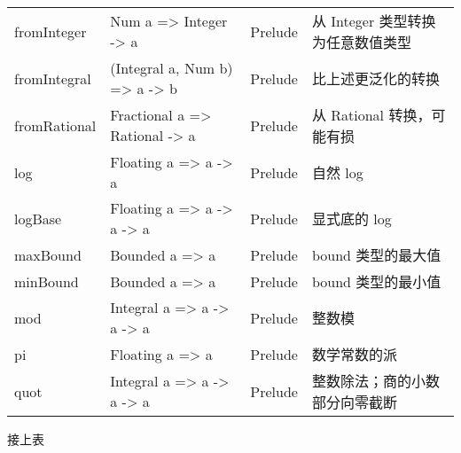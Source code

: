 \documentclass[./main.tex]{subfiles}
\begin{document}
\begin{center}
\begin{tabular}{|l|p{6cm}|l|p{3cm}|}
    fromInteger    & Num a => Integer -> a                     & Prelude    & 从 Integer 类型转换为任意数值类型       \\
    fromIntegral   & (Integral a, Num b) => a -> b             & Prelude    & 比上述更泛化的转换                   \\
    fromRational   & Fractional a => Rational -> a             & Prelude    & 从 Rational 转换，可能有损          \\
    log            & Floating a => a -> a                      & Prelude    & 自然 log                      \\
    logBase        & Floating a => a -> a -> a                 & Prelude    & 显式底的 log                    \\
    maxBound       & Bounded a => a                            & Prelude    & bound 类型的最大值                \\
    minBound       & Bounded a => a                            & Prelude    & bound 类型的最小值                \\
    mod            & Integral a => a -> a -> a                 & Prelude    & 整数模                         \\
    pi             & Floating a => a                           & Prelude    & 数学常数的派                      \\
    quot           & Integral a => a -> a -> a                 & Prelude    & 整数除法；商的小数部分向零截断             \\
    \hline
  \end{tabular}
\end{center}

接上表
\end{document}
